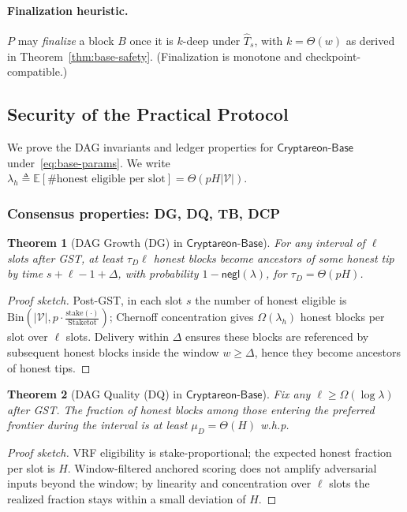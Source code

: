\documentclass[11pt]{article}
\newtheorem{theorem}{Theorem}[section]
\newcommand{\ProjBase}{\ensuremath{\mathsf{Cryptareon\text{-}Base}}\xspace}
\newcommand{\negl}{\ensuremath{\mathsf{negl}}\xspace}
\newcommand{\Val}{\ensuremath{\mathcal{V}}\xspace}
\newcommand{\stake}{\ensuremath{\mathrm{stake}}\xspace}
\newcommand{\StakeTot}{\ensuremath{\mathrm{Stake}{\mathrm{tot}}}\xspace}
\newcommand{\stakefrac}[1]{\ensuremath{\frac{\stake(#1)}{\StakeTot}}\xspace}
\begin{document}




\paragraph{Finalization heuristic.}
$P$ may \emph{finalize} a block $B$ once it is $k$-deep under $\hat T_s$, with $k=\Theta(w)$ as derived in Theorem~\ref{thm:base-safety}. (Finalization is monotone and checkpoint-compatible.)

\subsection{Security of the Practical Protocol}
\label{subsec:base-security}
We prove the DAG invariants and ledger properties for \ProjBase under~\eqref{eq:base-params}. We write $\lambda_h \triangleq \mathbb{E}[\#\text{honest eligible per slot}]=\Theta(pH|\Val|)$.

\subsubsection{Consensus properties: DG, DQ, TB, DCP}
\begin{theorem}[DAG Growth (DG) in \ProjBase]
\label{thm:base-DG}
For any interval of $\ell$ slots after GST, at least $\tau_D\ell$ honest blocks become ancestors of some honest tip by time $s{+}\ell{-}1{+}\Delta$, with probability $1-\negl(\lambda)$, for $\tau_D=\Theta(pH)$.
\end{theorem}
\begin{proof}[Proof sketch]
Post-GST, in each slot $s$ the number of honest eligible is $\mathrm{Bin}(|\Val|,p\cdot \stakefrac{\cdot})$; Chernoff concentration gives $\Omega(\lambda_h)$ honest blocks per slot over $\ell$ slots. Delivery within $\Delta$ ensures these blocks are referenced by subsequent honest blocks inside the window $w\ge \Delta$, hence they become ancestors of honest tips.
\end{proof}

\begin{theorem}[DAG Quality (DQ) in \ProjBase]
\label{thm:base-DQ}
Fix any $\ell\ge \Omega(\log\lambda)$ after GST. The fraction of honest blocks among those entering the preferred frontier during the interval is at least $\mu_D=\Theta(H)$ w.h.p.
\end{theorem}
\begin{proof}[Proof sketch]
VRF eligibility is stake-proportional; the expected honest fraction per slot is $H$. Window-filtered anchored scoring does not amplify adversarial inputs beyond the window; by linearity and concentration over $\ell$ slots the realized fraction stays within a small deviation of $H$.
\end{proof}
\end{document}
